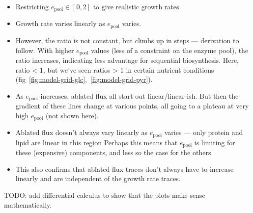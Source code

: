 \begin{itemize}
  \item Restricting $e_{\mathrm{pool}} \in [0, 2]$ to give realistic growth rates.
  \item Growth rate varies linearly as $e_{\mathrm{pool}}$ varies.
  \item However, the ratio is not constant, but climbs up in steps --- derivation to follow.
        With higher $e_{\mathrm{pool}}$ values (less of a constraint on the enzyme pool), the ratio increases, indicating less advantage for sequential biosynthesis.
        Here, ratio < 1, but we've seen ratios > 1 in certain nutrient conditions (fig~\ref{fig:model-grid-glc},~\ref{fig:model-grid-pyr}).
  \item As $e_{\mathrm{pool}}$ increases, ablated flux all start out linear/linear-ish.
        But then the gradient of these lines change at various points, all going to a plateau at very high $e_{\mathrm{pool}}$ (not shown here).
  \item Ablated flux doesn't always vary linearly as $e_{\mathrm{pool}}$ varies --- only protein and lipid are linear in this region
        Perhaps this means that $e_{\mathrm{pool}}$ is limiting for these (expensive) components, and less so the case for the others.
  \item This also confirms that ablated flux traces don't always have to increase linearly and are independent of the growth rate traces.
\end{itemize}

TODO: add differential calculus to show that the plots make sense mathematically.

